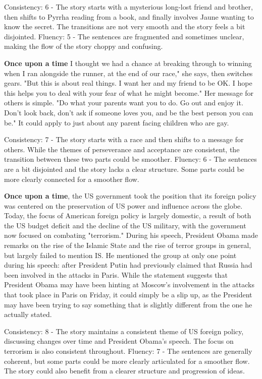\documentclass{article}
\begin{document}
Consistency: 6 - The story starts with a mysterious long-lost friend and brother, then shifts to Pyrrha reading from a book, and finally involves Jaune wanting to know the secret. The transitions are not very smooth and the story feels a bit disjointed.
Fluency: 5 - The sentences are fragmented and sometimes unclear, making the flow of the story choppy and confusing.

\textbf{Once upon a time} I thought we had a chance at breaking through to winning when I ran alongside the runner, at the end of our race," she says, then switches gears. "But this is about real things. I want her and my friend to be OK. I hope this helps you to deal with your fear of what he might become." Her message for others is simple. "Do what your parents want you to do. Go out and enjoy it. Don't look back, don't ask if someone loves you, and be the best person you can be." It could apply to just about any parent facing children who are gay.

Consistency: 7 - The story starts with a race and then shifts to a message for others. While the themes of perseverance and acceptance are consistent, the transition between these two parts could be smoother.
Fluency: 6 - The sentences are a bit disjointed and the story lacks a clear structure. Some parts could be more clearly connected for a smoother flow.

\textbf{Once upon a time}, the US government took the position that its foreign policy was centered on the preservation of US power and influence across the globe. Today, the focus of American foreign policy is largely domestic, a result of both the US budget deficit and the decline of the US military, with the government now focused on combating "terrorism." During his speech, President Obama made remarks on the rise of the Islamic State and the rise of terror groups in general, but largely failed to mention IS. He mentioned the group at only one point during his speech: after President Putin had previously claimed that Russia had been involved in the attacks in Paris. While the statement suggests that President Obama may have been hinting at Moscow's involvement in the attacks that took place in Paris on Friday, it could simply be a slip up, as the President may have been trying to say something that is slightly different from the one he actually stated.

Consistency: 8 - The story maintains a consistent theme of US foreign policy, discussing changes over time and President Obama's speech. The focus on terrorism is also consistent throughout.
Fluency: 7 - The sentences are generally coherent, but some parts could be more clearly articulated for a smoother flow. The story could also benefit from a clearer structure and progression of ideas.
\end{document}
